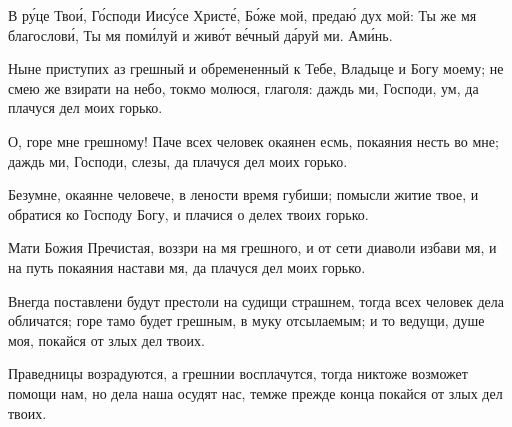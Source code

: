 \begin{mymulticols}

В р\'{у}це Тво\'{и}, Г\'{о}споди Иис\'{у}се Христ\'{е}, Б\'{о}же мой, преда\'{ю} дух мой: Ты же мя благослов\'{и}, Ты мя пом\'{и}луй и жив\'{о}т в\'{е}чный д\'{а}руй ми. Ам\'{и}нь.

\end{mymulticols}

\mychapterending


\begin{mymulticols}





Ныне приступих аз грешный и обремененный к Тебе, Владыце и Богу моему; не смею же взирати на небо, токмо молюся, глаголя: даждь ми, Господи, ум, да плачуся дел моих горько.


О, горе мне грешному! Паче всех человек окаянен есмь, покаяния несть во мне; даждь ми, Господи, слезы, да плачуся дел моих горько.

\slava

Безумне, окаянне человече, в лености время губиши; помысли житие твое, и обратися ко Господу Богу, и плачися о делех твоих горько.

\inyne

Мати Божия Пречистая, воззри на мя грешного, и от сети диаволи избави мя, и на путь покаяния настави мя, да плачуся дел моих горько.




Внегда поставлени будут престоли на судищи страшнем, тогда всех человек дела обличатся; горе тамо будет грешным, в муку отсылаемым; и то ведущи, душе моя, покайся от злых дел твоих.


Праведницы возрадуются, а грешнии восплачутся, тогда никтоже возможет помощи нам, но дела наша осудят нас, темже прежде конца покайся от злых дел твоих.


\end{mymulticols}

